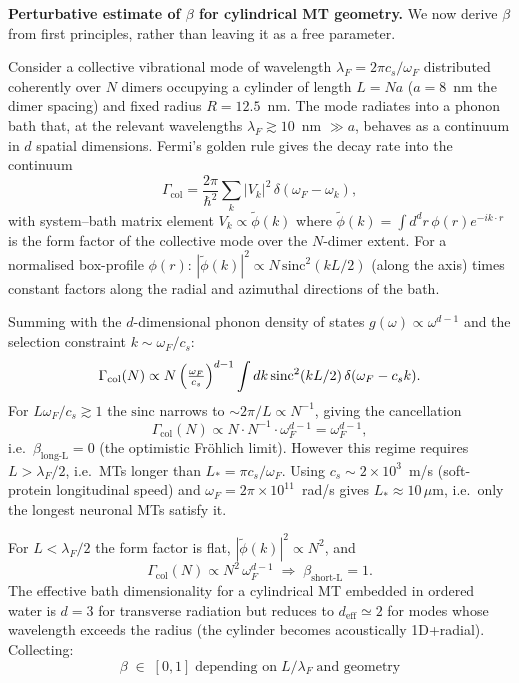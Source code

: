 \documentclass[twocolumn,10pt]{article}
\renewcommand{\hbar}{\hslash}
\begin{document}
\textbf{Perturbative estimate of $\beta$ for cylindrical MT geometry.}
We now derive $\beta$ from first principles, rather than leaving it as a
free parameter.

Consider a collective vibrational mode of wavelength $\lambda_F=2\pi c_s
/\omega_F$ distributed coherently over $N$ dimers occupying a cylinder of
length $L=Na$ ($a=8$~nm the dimer spacing) and fixed radius $R=12.5$~nm.
The mode radiates into a phonon bath that, at the relevant wavelengths
$\lambda_F\gtrsim 10$~nm $\gg a$, behaves as a continuum in $d$ spatial
dimensions. Fermi's golden rule gives the decay rate into the continuum
\begin{equation}
\Gamma_{\text{col}}=\frac{2\pi}{\hbar^2}\sum_k|V_k|^2\,\delta(\omega_F
-\omega_k),
\end{equation}
with system--bath matrix element $V_k\propto \tilde\phi(k)$ where
$\tilde\phi(k)=\int d^d r\,\phi(r)e^{-i k\cdot r}$ is the form factor of
the collective mode over the $N$-dimer extent. For a normalised
box-profile $\phi(r)$:
$|\tilde\phi(k)|^2\propto N\,\mathrm{sinc}^2(kL/2)$ (along the axis) times
constant factors along the radial and azimuthal directions of the bath.

Summing with the $d$-dimensional phonon density of states
$g(\omega)\propto\omega^{d-1}$ and the selection constraint
$k\sim\omega_F/c_s$:
\begin{equation}
\Gamma_{\text{col}}(N)\propto N\,
\Bigl(\tfrac{\omega_F}{c_s}\Bigr)^{d-1}
\int dk\,\mathrm{sinc}^2(kL/2)\,\delta(\omega_F-c_s k).
\end{equation}
For $L\omega_F/c_s\gtrsim 1$ the $\mathrm{sinc}$ narrows to
$\sim 2\pi/L\propto N^{-1}$, giving the cancellation
\begin{equation}
\Gamma_{\text{col}}(N)\propto N\cdot N^{-1}\cdot\omega_F^{d-1}
=\omega_F^{d-1},
\end{equation}
i.e.\ $\beta_{\text{long-L}}=0$ (the optimistic Fr\"ohlich limit). However
this regime requires $L>\lambda_F/2$, i.e.\ MTs longer than
$L_*=\pi c_s/\omega_F$. Using $c_s\sim 2\times 10^3$~m/s (soft-protein
longitudinal speed) and $\omega_F=2\pi\times 10^{11}$~rad/s gives
$L_*\approx 10\,\mu$m, i.e.\ only the longest neuronal MTs satisfy it.

For $L<\lambda_F/2$ the form factor is flat,
$|\tilde\phi(k)|^2\propto N^2$, and
\begin{equation}
\Gamma_{\text{col}}(N)\propto N^2\,\omega_F^{d-1}
\;\Rightarrow\;\beta_{\text{short-L}}=1.
\end{equation}
The effective bath dimensionality for a cylindrical MT embedded in
ordered water is $d=3$ for transverse radiation but reduces to
$d_{\text{eff}}\simeq 2$ for modes whose wavelength exceeds the radius
(the cylinder becomes acoustically 1D+radial). Collecting:
\begin{equation}
\boxed{\;\beta\;\in\;[0,1]\;\text{depending on}\;L/\lambda_F\;\text{and
geometry}\;}
\end{equation}
\end{document}
